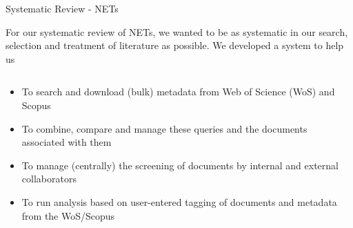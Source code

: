 \documentclass[9pt]{beamer}
\begin{document}
\begin{frame}{Systematic Review - NETs}

For our systematic review of NETs, we wanted to be as systematic in our search, selection and treatment of literature as possible. We developed a system to help us

\begin{columns}
	\begin{column}{1\linewidth}
		\begin{itemize}
			\item To search and download (bulk) metadata from Web of Science (WoS) and Scopus
			\item To combine, compare and manage these queries and the documents associated with them
			\item To manage (centrally) the screening of documents by internal and external collaborators
			\item To run analysis based on user-entered tagging of documents and metadata from the WoS/Scopus
		\end{itemize}
	\end{column}

\end{columns}

\end{frame}


\end{document}
